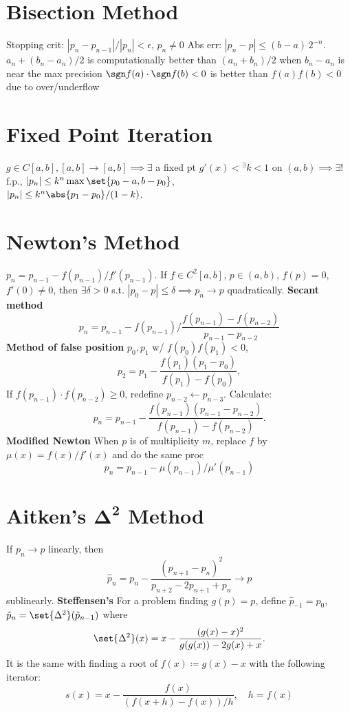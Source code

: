 \documentclass[9pt]{memoir}
\begin{document}
\begin{multicols*}{3}
    \section{Bisection Method}
    \s Stopping crit: $|p_n - p_{n-1}|/|p_n| < \epsilon$, $p_n\ne 0$ \nl
    \s Abs err: $|p_n - p| \le (b-a)\,2^{-n}$. \nl
    \s $a_n + (b_n-a_n)/2$ is computationally better than $(a_n+b_n)/2$ when $b_n-a_n$ is near the max precision \nl
    \s $\sgn f(a)\cdot \sgn f(b)<0$ is better than $f(a)f(b)<0$ due to over/underflow

    \section{Fixed Point Iteration}
    \s $g\in C[a,b],[a,b]\to [a,b]\implies \exists$ a fixed pt\nl
    \s $g'(x)<{^\exists k} < 1$ on $(a,b)\implies \exists!$ f.p.,\nl
    \hspace*{\fill}$|p_n| \le k^n \max\set{p_0-a,b-p_0}$,\\
    \hspace*{\fill}$|p_n| \le k^n\abs{p_1-p_0}/(1-k)$.

    \section{Newton's Method}
    \s $p_n = p_{n-1} - {f(p_{n-1})}/{f'(p_{n-1})}.$ \nl
    If $f\in C^2[a,b]$, $p\in(a,b)$, $f(p)=0$, $f'(0)\ne 0$, then $\exists \delta>0$ s.t. $|p_0-p|\le \delta\implies p_n\to p$ quadratically. \nl[1mm]
    \s \textbf{Secant method}
    $$ p_n = p_{n-1} - f(p_{n-1}) {\Big/} \frac{f(p_{n-1})-f(p_{n-2})}{p_{n-1}-p_{n-2}}$$
    \s \textbf{Method of false position}
    $p_0,p_1$ w/ $f(p_0)f(p_1)<0$,
    $$ p_2 = p_1 - \frac{f(p_1)(p_1-p_0)}{f(p_1)-f(p_0)},$$
    If $f(p_{n-1})\cdot f(p_{n-2})\ge 0$, redefine $p_{n-2}\leftarrow p_{n-3}$. Calculate:
    $$ p_n = p_{n-1} - \frac{f(p_{n-1})(p_{n-1}-p_{n-2})}{f(p_{n-1}) - f(p_{n-2})}. $$
    \s \textbf{Modified Newton}
    When $p$ is of multiplicity $m$, replace $f$ by $\mu(x) =f(x)/f'(x)$ and do the same proc
    $$ p_n = p_{n-1} - \mu(p_{n-1})/\mu'(p_{n-1})$$

    \section{Aitken's $\boldsymbol{\Delta^2}$ Method}
    \s If $p_n\to p$ linearly, then
    $$ \hat p_n = p_n - \frac{(p_{n+1}-p_n)^2}{p_{n+2}-2p_{n+1}+p_n} \to p $$
    sublinearly.  \nl
    \s \textbf{Steffensen's} For a problem finding $g(p)=p$, define $\hat p_{-1} = p_0$, $\hat p_n = \set{\Delta^2} (\hat p_{n-1})$ where
    $$ \set{\Delta^2}(x) = x - \frac{ (g(x) - x)^2 }{ g(g(x)) - 2g(x) + x }. $$
    It is the same with finding a root of $f(x) \coloneqq g(x) - x$ with the following iterator:
    $$ s(x) = x - \frac{f(x)}{(f(x+h)-f(x))/h},\quad h=f(x) $$


\end{multicols*}
\end{document}

